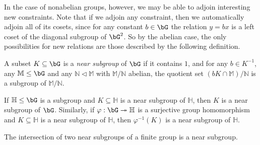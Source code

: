 In the case of nonabelian groups, however, we may be able to adjoin interesting new constraints. Note that if we adjoin any constraint, then we automatically adjoin all of its cosets, since for any constant $b \in \bG$ the relation $y = bx$ is a left coset of the diagonal subgroup of $\bG^2$. So by the abelian case, the only possibilities for new relations are those described by the following definition.

\begin{defn} A subset $K \subseteq \bG$ is a \emph{near subgroup} of $\bG$ if it contains $1$, and for any $b \in K^{-1}$, any $\mathbb{M} \le \bG$ and any $\mathbb{N} \lhd \mathbb{M}$ with $\mathbb{M}/\mathbb{N}$ abelian, the quotient set $(bK\cap \mathbb{M})/\mathbb{N}$ is a subgroup of $\mathbb{M}/\mathbb{N}$.
\end{defn}

\begin{prop} If $\mathbb{H} \le \bG$ is a subgroup and $K \subseteq \mathbb{H}$ is a near subgroup of $\mathbb{H}$, then $K$ is a near subgroup of $\bG$. Similarly, if $\varphi : \bG \twoheadrightarrow \mathbb{H}$ is a surjective group homomorphism and $K \subseteq \mathbb{H}$ is a near subgroup of $\mathbb{H}$, then $\varphi^{-1}(K)$ is a near subgroup of $\mathbb{H}$.
\end{prop}

\begin{thm}\label{near-subgroups} The intersection of two near subgroups of a finite group is a near subgroup.
\end{thm}

